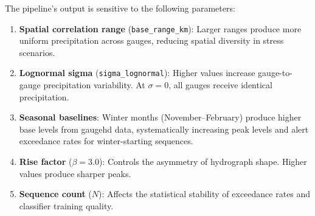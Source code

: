 \documentclass[11pt,a4paper]{article}
\begin{document}
The pipeline's output is sensitive to the following parameters:

\begin{enumerate}[nosep]
    \item \textbf{Spatial correlation range} (\texttt{base\_range\_km}):
          Larger ranges produce more uniform precipitation across gauges,
          reducing spatial diversity in stress scenarios.
    \item \textbf{Lognormal sigma} (\texttt{sigma\_lognormal}):
          Higher values increase gauge-to-gauge precipitation variability.
          At $\sigma = 0$, all gauges receive identical precipitation.
    \item \textbf{Seasonal baselines}: Winter months (November--February) produce
          higher base levels from gaugehd data, systematically increasing
          peak levels and alert exceedance rates for winter-starting sequences.
    \item \textbf{Rise factor} ($\beta = 3.0$): Controls the asymmetry of
          hydrograph shape. Higher values produce sharper peaks.
    \item \textbf{Sequence count} ($N$): Affects the statistical stability of
          exceedance rates and classifier training quality.
\end{enumerate}

\mkmlimitations
\end{document}
